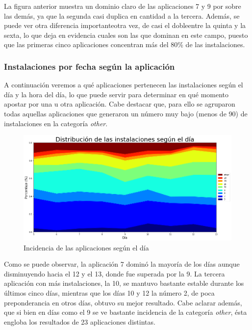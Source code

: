 \documentclass[a4paper, 12pt]{article}
\begin{document}
		La figura anterior muestra un dominio claro de las aplicaciones 7 y 9 por sobre las demás, ya que la segunda casi duplica en cantidad a la tercera. Además, se puede ver otra diferencia importante{\textemdash}otra vez, de casi el doble{\textemdash}entre la quinta y la sexta, lo que deja en evidencia cuales son las que dominan en este campo, puesto que las primeras cinco aplicaciones concentran más del 80\% de las instalaciones.

	\subsubsection{Instalaciones por fecha según la aplicación}
		A continuación veremos a qué aplicaciones pertenecen las instalaciones según el día y la hora del día, lo que puede servir para determinar en qué momento apostar por una u otra aplicación. Cabe destacar que, para ello se agruparon todas aquellas aplicaciones que generaron un número muy bajo (menos de 90) de instalaciones en la categoría \textit{other}.

		\FloatBarrier
		\begin{figure}[h]
			\centering
			\includegraphics[width= \textwidth]{images/installs/appsxdiaarea.png}
			\caption{Incidencia de las aplicaciones según el día}
		\end{figure}
		\FloatBarrier

		Como se puede observar, la aplicación 7 dominó la mayoría de los días aunque disminuyendo hacia el 12 y el 13, donde fue superada por la 9. La tercera aplicación con más instalaciones, la 10, se mantuvo bastante estable durante los últimos cinco días, mientras que los días 10 y 12 la número 2, de poca preponderancia en otros días, obtuvo su mejor resultado. Cabe aclarar además, que si bien en días como el 9 se ve bastante incidencia de la categoría \textit{other}, ésta engloba los resultados de 23 aplicaciones distintas.
\end{document}
